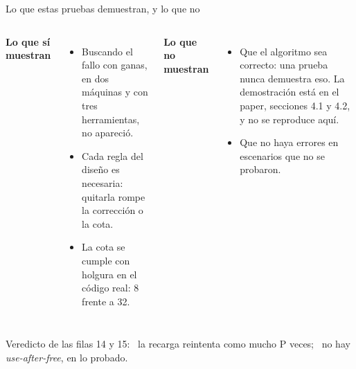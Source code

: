 \begin{frame}{Lo que estas pruebas demuestran, y lo que no}
  \begin{columns}[T,onlytextwidth]
    \small\textbf{\color{bien}Lo que sí muestran}\par\vspace{1mm}
    \footnotesize
    \begin{itemize}
      \item Buscando el fallo con ganas, en dos máquinas y con tres herramientas, no apareció.
      \item Cada regla del diseño es necesaria: quitarla rompe la corrección o la cota.
      \item La cota se cumple con holgura en el código real: 8 frente a 32.
    \end{itemize}
    \small\textbf{\color{mal}Lo que no muestran}\par\vspace{1mm}
    \footnotesize
    \begin{itemize}
      \item Que el algoritmo sea correcto: una prueba nunca demuestra eso. La demostración está en el paper, secciones 4.1 y 4.2, y no se reproduce aquí.
      \item Que no haya errores en escenarios que no se probaron.
    \end{itemize}
  \end{columns}
  \vspace{4mm}
  \begin{idea}Veredicto de las filas 14 y 15: \vsi\ la recarga reintenta como mucho P veces; \vsi\ no hay \textit{use-after-free}, en lo probado.\end{idea}
\end{frame}
